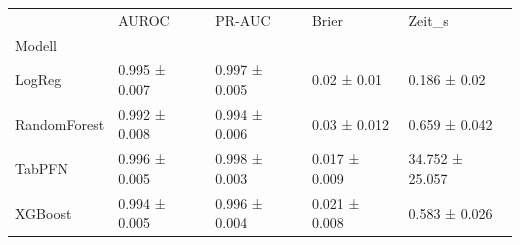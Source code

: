 \begin{tabular}{lllll}
\toprule
 & AUROC & PR-AUC & Brier & Zeit\_s \\
Modell &  &  &  &  \\
\midrule
LogReg & 0.995 ± 0.007 & 0.997 ± 0.005 & 0.02 ± 0.01 & 0.186 ± 0.02 \\
RandomForest & 0.992 ± 0.008 & 0.994 ± 0.006 & 0.03 ± 0.012 & 0.659 ± 0.042 \\
TabPFN & 0.996 ± 0.005 & 0.998 ± 0.003 & 0.017 ± 0.009 & 34.752 ± 25.057 \\
XGBoost & 0.994 ± 0.005 & 0.996 ± 0.004 & 0.021 ± 0.008 & 0.583 ± 0.026 \\
\bottomrule
\end{tabular}
